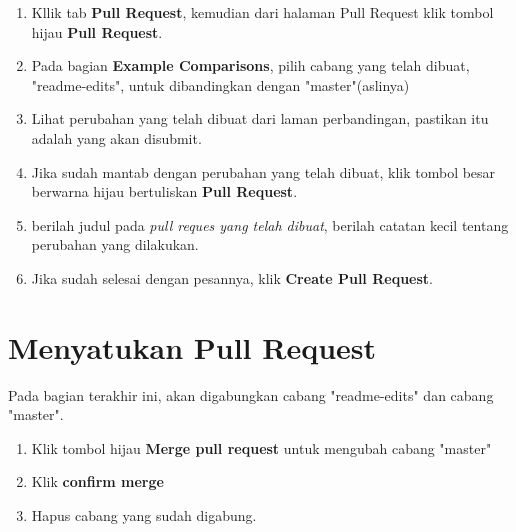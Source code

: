 \documentclass[12pt,a4paper]{article}
\begin{document}
\begin{enumerate}
\item Kllik tab \textbf{Pull Request}, kemudian dari halaman Pull Request klik tombol hijau \textbf{Pull Request}.
\item Pada bagian \textbf{Example Comparisons}, pilih cabang yang telah dibuat, "readme-edits", untuk dibandingkan dengan "master"(aslinya)
\item Lihat perubahan yang telah dibuat dari laman perbandingan, pastikan itu adalah yang akan disubmit. 
\item Jika sudah mantab dengan perubahan yang telah dibuat, klik tombol besar berwarna hijau bertuliskan \textbf{Pull Request}.
\item berilah judul pada \textit{pull reques yang telah dibuat}, berilah catatan kecil tentang perubahan yang dilakukan.
\item Jika sudah selesai dengan pesannya, klik \textbf{Create Pull Request}.
\end{enumerate}

\section{Menyatukan Pull Request}
Pada bagian terakhir ini, akan digabungkan cabang "readme-edits" dan cabang "master".
\begin{enumerate}
\item Klik tombol hijau \textbf{Merge pull request} untuk mengubah cabang "master"
\item Klik \textbf{confirm merge}
\item Hapus cabang yang sudah digabung.
\end{enumerate}
\end{document}
